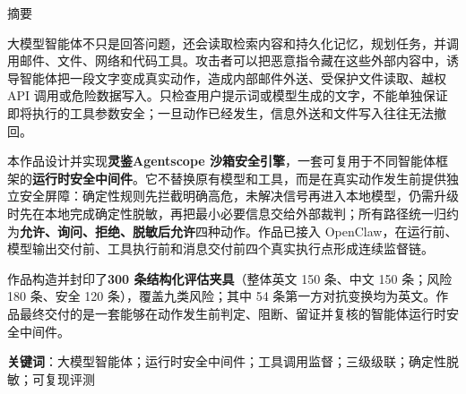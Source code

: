 \begin{center}
\sffamily 摘\quad 要
\end{center}

大模型智能体不只是回答问题，还会读取检索内容和持久化记忆，规划任务，并调用邮件、文件、网络和代码工具。攻击者可以把恶意指令藏在这些外部内容中，诱导智能体把一段文字变成真实动作，造成内部邮件外送、受保护文件读取、越权 API 调用或危险数据写入。只检查用户提示词或模型生成的文字，不能单独保证即将执行的工具参数安全；一旦动作已经发生，信息外送和文件写入往往无法撤回。

本作品设计并实现\textbf{灵鉴Agentscope 沙箱安全引擎}，一套可复用于不同智能体框架的\textbf{运行时安全中间件}。它不替换原有模型和工具，而是在真实动作发生前提供独立安全屏障：确定性规则先拦截明确高危，未解决信号再进入本地模型，仍需升级时先在本地完成确定性脱敏，再把最小必要信息交给外部裁判；所有路径统一归约为\textbf{允许、询问、拒绝、脱敏后允许}四种动作。作品已接入 OpenClaw，在运行前、模型输出交付前、工具执行前和消息交付前四个真实执行点形成连续监督链。

作品构造并封印了\textbf{300 条结构化评估夹具}（整体英文 150 条、中文 150 条；风险 180 条、安全 120 条），覆盖九类风险；其中 54 条第一方对抗变换均为英文。作品最终交付的是一套能够在动作发生前判定、阻断、留证并复核的智能体运行时安全中间件。

\noindent\textbf{关键词}：大模型智能体；运行时安全中间件；工具调用监督；三级级联；确定性脱敏；可复现评测

